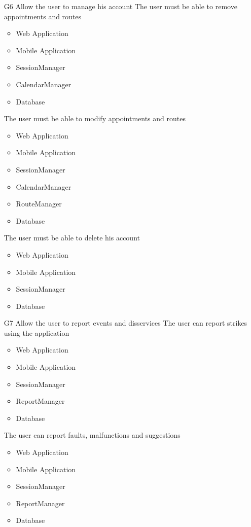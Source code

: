 \begin{itemize}
 	\item[G6] Allow the user to manage his account
 	\subitem[G6.1] The user must be able to remove appointments and routes
 	\begin{itemize}[leftmargin=1in]
 		\item Web Application
 		\item Mobile Application
 		\item SessionManager
 		\item CalendarManager
 		\item Database
 	\end{itemize}
 	\subitem[G6.2] The user must be able to modify appointments and routes
 	\begin{itemize}[leftmargin=1in]
 		\item Web Application
 		\item Mobile Application
 		\item SessionManager
 		\item CalendarManager
 		\item RouteManager
 		\item Database
 	\end{itemize}
 	\subitem[G6.3] The user must be able to delete his account
 	\begin{itemize}[leftmargin=1in]
 		\item Web Application
 		\item Mobile Application
 		\item SessionManager
 		\item Database
 	\end{itemize}
 \vspace{0.5cm}
 
 	\item[G7] Allow the user to report events and disservices 
 	\subitem[G7.1] The user can report strikes using the application
 	\begin{itemize}[leftmargin=1in]
 		\item Web Application
 		\item Mobile Application
 		\item SessionManager
 		\item ReportManager
 		\item Database
 	\end{itemize}
 	\subitem[G7.2] The user can report faults, malfunctions and suggestions
 	\begin{itemize}[leftmargin=1in]
 		\item Web Application
 		\item Mobile Application
 		\item SessionManager
 		\item ReportManager
 		\item Database
 	\end{itemize}
 
 \end{itemize}